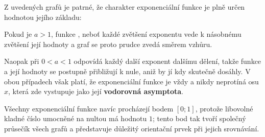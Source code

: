 \documentclass[12pt,a4paper]{article}
\begin{document}
\begin{center}
\begin{minipage}{0.48\textwidth}
\centering
{}
\end{minipage}
\hfill
\begin{minipage}{0.48\textwidth}
\centering
{}
\end{minipage}
\end{center}

Z uvedených grafů je patrné, že charakter exponenciální funkce je plně určen hodnotou jejího
základu:

\smallskip
Pokud je \textbf{$a>1$}, funkce , neboť každé zvětšení exponentu vede k násobnému
zvětšení její hodnoty a graf se proto prudce zvedá směrem vzhůru.

\smallskip
Naopak při \textbf{$0<a<1$} odpovídá
každý další exponent dalšímu dělení, takže funkce  a její hodnoty se postupně přibližují
k nule, aniž by jí kdy skutečně dosáhly. V obou případech však platí, že exponenciální funkce je vždy
 a nikdy neprotíná osu $x$, která zde vystupuje jako její \textbf{vodorovná asymptota}.

Všechny exponenciální funkce navíc procházejí bodem \textbf{$[0;1]$}, protože libovolné kladné číslo
umocněné na nultou má hodnotu $1$; tento bod tak tvoří společný průsečík všech grafů a představuje
důležitý orientační prvek při jejich srovnávání.
\end{document}
